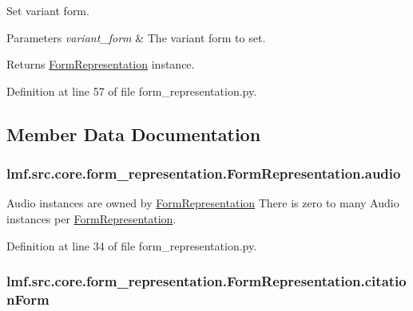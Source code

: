 Set variant form. 


\begin{DoxyParams}{Parameters}
{\em variant\+\_\+form} & The variant form to set. \\
\hline
\end{DoxyParams}
\begin{DoxyReturn}{Returns}
\hyperlink{classlmf_1_1src_1_1core_1_1form__representation_1_1_form_representation}{Form\+Representation} instance. 
\end{DoxyReturn}


Definition at line 57 of file form\+\_\+representation.\+py.



\subsection{Member Data Documentation}
\hypertarget{classlmf_1_1src_1_1core_1_1form__representation_1_1_form_representation_ac13f0605619b9bdc6b921ae19b39c068}{
\subsubsection[{audio}]{\setlength{\rightskip}{0pt plus 5cm}lmf.\+src.\+core.\+form\+\_\+representation.\+Form\+Representation.\+audio}}\label{classlmf_1_1src_1_1core_1_1form__representation_1_1_form_representation_ac13f0605619b9bdc6b921ae19b39c068}


Audio instances are owned by \hyperlink{classlmf_1_1src_1_1core_1_1form__representation_1_1_form_representation}{Form\+Representation} There is zero to many Audio instances per \hyperlink{classlmf_1_1src_1_1core_1_1form__representation_1_1_form_representation}{Form\+Representation}. 



Definition at line 34 of file form\+\_\+representation.\+py.

\hypertarget{classlmf_1_1src_1_1core_1_1form__representation_1_1_form_representation_a70151ff258dea274006e4976818847a3}{
\subsubsection[{citation\+Form}]{\setlength{\rightskip}{0pt plus 5cm}lmf.\+src.\+core.\+form\+\_\+representation.\+Form\+Representation.\+citation\+Form}}\label{classlmf_1_1src_1_1core_1_1form__representation_1_1_form_representation_a70151ff258dea274006e4976818847a3}


